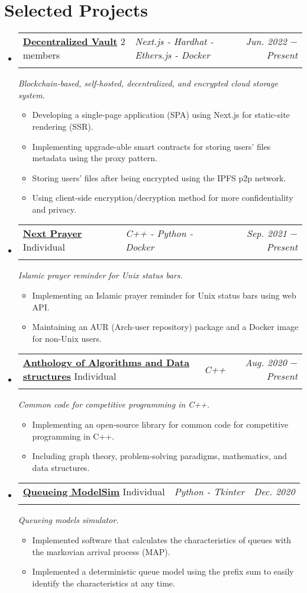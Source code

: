 \documentclass[letterpaper, 11pt]{article}
\makeatletter
\newcommand{\project}[7] {
  \vspace{-1pt}\item
  \begin{tabular*}{0.97\textwidth}[t]{ll@{\extracolsep{\fill}}r}
    #1 \href{#4}{\textbf{\color{RoyalBlue}#2}} \textbar{} #7 \textbar{ } & \textit{#5} & \textit{\small #3} \\
    \vspace{-10pt}
  \end{tabular*}
  \textit{\small #6}
  \vspace{-8pt}
}
\newcommand{\subproject}[1] {
\item\small
  {#1}
  \vspace{-2pt}
}
\makeatother
\begin{document}
\section{Selected Projects}
\begin{itemize}[leftmargin=*]
  \project
  {\faIcon{cloud}}
  {Decentralized Vault}{Jun. 2022 $-$ Present}
  {https://devault.vercel.app/}{Next.js - Hardhat - Ethers.js - Docker}
  {Blockchain-based, self-hosted, decentralized, and encrypted cloud storage system.}{2 members}

  \begin{itemize}
    \subproject
    {Developing a single-page application (SPA) using Next.js for static-site rendering (SSR).}
    \subproject
    {Implementing upgrade-able smart contracts for storing users' files metadata using the proxy pattern.}
    \subproject
    {Storing users' files after being encrypted using the IPFS p2p network.}
    \subproject
    {Using client-side encryption/decryption method for more confidentiality and privacy.}
  \end{itemize}\vspace{-4pt}

  \project
  {\faIcon{mosque}}
  {Next Prayer}{Sep. 2021 $-$ Present}
  {https://github.com/AbdeltwabMF/nxprayer}{C++ - Python - Docker}
  {Islamic prayer reminder for Unix status bars.}{Individual}

  \begin{itemize}
    \subproject
    {Implementing an Islamic prayer reminder for Unix status bars using web API.}
    \subproject
    {Maintaining an AUR (Arch-user repository) package and a Docker image for non-Unix users.}
  \end{itemize}\vspace{-4pt}

  \project
  {\faIcon{laptop-code}}
  {Anthology of Algorithms and Data structures}{Aug. 2020 $-$ Present}
  {https://github.com/AbdeltwabMF/Anthology-of-Algorithms-and-Data-structures}{C++}
  {Common code for competitive programming in C++.}{Individual}

  \begin{itemize}
    \subproject
    {Implementing an open-source library for common code for competitive programming in C++.}
    \subproject
    {Including graph theory, problem-solving paradigms, mathematics, and data structures.}
  \end{itemize}\vspace{-4pt}

  \project
  {\faIcon{user-clock}}
  {Queueing ModelSim}{Dec. 2020}
  {https://github.com/AbdeltwabMF/Queueing-ModelSim}{Python - Tkinter}
  {Queueing models simulator.}{Individual}

  \begin{itemize}
    \subproject
    {Implemented software that calculates the characteristics of queues with the markovian arrival process (MAP).}
    \subproject
    {Implemented a deterministic queue model using the prefix sum to easily identify the characteristics at any time.}
  \end{itemize}\vspace{-4pt}
\end{itemize}
\end{document}
